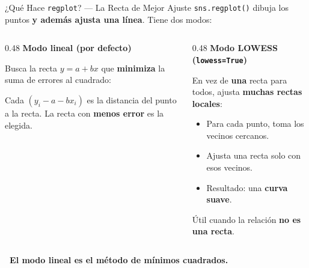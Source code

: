 \documentclass[aspectratio=169, 11pt]{beamer}
\begin{document}
\begin{frame}[shrink=10]{¿Qué Hace \texttt{regplot}? --- La Recta de Mejor Ajuste}
  \vspace{-4pt}
  {\footnotesize
    \texttt{sns.regplot()} dibuja los puntos \textbf{y además ajusta una línea}.
    Tiene dos modos:}

  \vspace{6pt}
  \begin{columns}[T]
    \begin{column}{0.48\textwidth}
      {\footnotesize\bfseries\color{codeBlue} Modo lineal (por defecto)}
      \vspace{4pt}

      {\scriptsize
      Busca la recta $y = a + bx$ que \textbf{minimiza}
      la suma de errores al cuadrado:
      }

      \vspace{4pt}
      \begin{center}
      \end{center}

      \vspace{2pt}
      {\scriptsize
      Cada $(y_i - a - bx_i)$ es la distancia del punto a la recta.
      La recta con \textbf{menos error} es la elegida.
      }
    \end{column}

    \begin{column}{0.48\textwidth}
      {\footnotesize\bfseries\color{codePurple} Modo LOWESS (\texttt{lowess=True})}
      \vspace{4pt}

      {\scriptsize
      En vez de \textbf{una} recta para todos, ajusta
      \textbf{muchas rectas locales}:

      \begin{itemize}\setlength{\itemsep}{3pt}
        \item Para cada punto, toma los vecinos cercanos.
        \item Ajusta una recta solo con esos vecinos.
        \item Resultado: una \textbf{curva suave}.
      \end{itemize}

      Útil cuando la relación \textbf{no es una recta}.
      }
    \end{column}
  \end{columns}

  \vspace{4pt}
  {\scriptsize\color{arcaDark}\bfseries
    \faArrowRight\ El modo lineal es el \textbf{método de mínimos cuadrados}.}
\end{frame}
\end{document}
